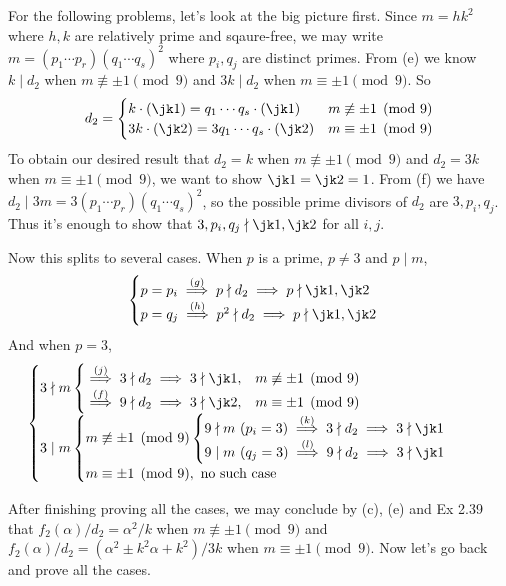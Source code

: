 \documentclass[../Chapter.tex]{subfiles}
\begin{document}
For the following problems, let's look at the big picture first. Since $m=hk^2$ where $h,k$ are relatively prime and sqaure-free, we may write $m=(p_1\cdots p_r)(q_1\cdots q_s)^2$ where $p_i,q_j$ are distinct primes. From (e) we know $k\mid d_2$ when $m\not\equiv \pm1 \pmod{9}$ and $3k\mid d_2$ when $m\equiv \pm1 \pmod{9}$. So
$$
d_2 =
\begin{cases}
k\cdot(\jk1) = q_1\cdots q_s\cdot(\jk1) & m\not\equiv \pm1 \pmod{9} \\
3k\cdot(\jk2) = 3q_1\cdots q_s\cdot(\jk2) & m\equiv \pm1 \pmod{9}
\end{cases}
$$
To obtain our desired result that $d_2=k$ when $m\not\equiv \pm1 \pmod{9}$ and $d_2=3k$ when $m\equiv \pm1 \pmod{9}$, we want to show $\jk1=\jk2=1$. From (f) we have $d_2\mid 3m=3(p_1\cdots p_r)(q_1\cdots q_s)^2$, so the possible prime divisors of $d_2$ are $3,p_i,q_j$. Thus it's enough to show that $3,p_i,q_j\nmid\jk1,\jk2$ for all $i,j$.

Now this splits to several cases. When $p$ is a prime, $p\neq 3$ and $p\mid m$,
$$\begin{cases}
p=p_i \overset{(g)}{\implies} p\nmid d_2 \implies p\nmid\jk1,\jk2 \\
p=q_j \overset{(h)}{\implies} p^2\nmid d_2 \implies p\nmid\jk1,\jk2 \\
\end{cases}$$
And when $p=3$,
$$\begin{cases}
3\nmid m
\begin{cases}
\overset{(j)}{\implies} 3\nmid d_2 \implies 3\nmid\jk1, & m\not\equiv \pm1 \pmod{9} \\
\overset{(f)}{\implies} 9\nmid d_2 \implies 3\nmid\jk2, & m\equiv \pm1 \pmod{9}
\end{cases}\\

3\mid m
\begin{cases}
m\not\equiv \pm1 \pmod{9}
\begin{cases}
9\nmid m \ ( p_i=3) \overset{(k)}{\implies} 3\nmid d_2 \implies 3\nmid\jk1 \\
9\mid m  \ ( q_j=3) \overset{(l)}{\implies} 9\nmid d_2 \implies 3\nmid\jk1 
\end{cases} \\
m\equiv \pm1 \pmod{9}, \text{ no such case}
\end{cases}
\end{cases}$$

After finishing proving all the cases, we may conclude by (c), (e) and Ex 2.39 that $f_2(\alpha)/d_2=\alpha^2/k$ when $m\not\equiv \pm1 \pmod{9}$ and $f_2(\alpha)/d_2=(\alpha^2\pm k^2\alpha+k^2)/3k$ when $m\equiv \pm1 \pmod{9}$. Now let's go back and prove all the cases.
\end{document}
